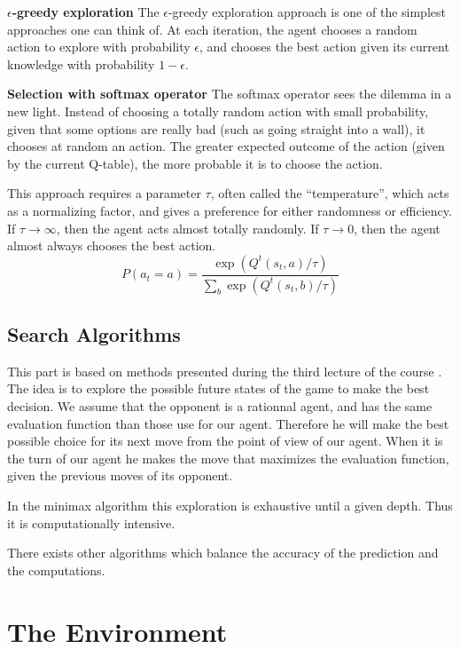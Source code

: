 \documentclass[journal, a4paper]{IEEEtran}
\begin{document}
\textbf{$\epsilon$-greedy exploration}
The $\epsilon$-greedy exploration approach is one of the simplest approaches one can think of.
At each iteration, the agent chooses a random action to explore with probability $\epsilon$, and chooses the best action given its current knowledge with probability $1-\epsilon$.
\cite{lecture-rl}
\cite{lecture-rl2}
\cite{intro-rl}

\textbf{Selection with softmax operator}
The softmax operator sees the dilemma in a new light.
Instead of choosing a totally random action with small probability, given that some options are really bad (such as going straight into a wall), it chooses at random an action.
The greater expected outcome of the action (given by the current Q-table), the more probable it is to choose the action.

This approach requires a parameter $\tau$, often called the ``temperature'', which acts as a normalizing factor, and gives a preference for either randomness or efficiency.
If $\tau \to \infty$, then the agent acts almost totally randomly.
If $\tau \to 0$, then the agent almost always chooses the best action.
\cite{intro-rl}
\[
    P\left(a_t = a\right) = \frac{\exp\left(Q^t(s_t, a) / \tau\right)}{\sum\limits_b \exp\left(Q^t(s_t, b) / \tau\right)}
\]


\subsection{Search Algorithms}
This part is based on methods presented during the third lecture of the course \cite{lecture_minimax}. The idea is to explore the possible future states of the game to make the best decision. We assume that the opponent is a rationnal agent, and has the same evaluation function than those use for our agent. Therefore he will make the best possible choice for its next move from the point of view of our agent. When it is the turn of our agent he makes the move that maximizes the evaluation function, given the previous moves of its opponent.

In the minimax algorithm this exploration is exhaustive until a given depth. Thus it is computationally intensive.

There exists other algorithms which balance the accuracy of the prediction and the computations.

\section{The Environment}
\end{document}
